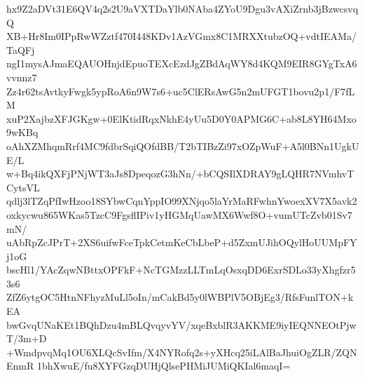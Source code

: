 hx9Z2aDVt31E6QV4q2s2U9aVXTDaYlb0NAba4ZYoU9Dgu3vAXiZrnb3jBzwcsvqQ
XB+Hr8Im0IPpRwWZztf470I448KDv1AzVGmx8C1MRXXtubzOQ+vdtIEAMa/TaQFj
ngI1mysAJmaEQAUOHnjdEpuoTEXcEzdJgZBdAqWY8d4KQM9EIR8GYgTxA6vvnnz7
Zz4r62tsAvtkyFwgk5ypRoA6n9W7s6+uc5ClERsAwG5n2mUFGT1bovu2p1/F7fLM
xuP2XajbzXFJGKgw+0ElKtidRqxNkhE4yUu5D0Y0APMG6C+ab8L8YH64Mxo9wKBq
oAhXZMhqmRrf4MC9fdbrSqiQOfdBB/T2bTIBzZi97xOZpWuF+A5l0BNn1UgkUE/L
w+Bq4ikQXFjPNjWT3aJs8DpeqozG3hNn/+bCQSIlXDRAY9gLQHR7NVmhvTCytsVL
qdlj3lTZqPfIwHzoo18SYbwCqnYppIO99XNjqo5laYrMaRFwhnYwoexXV7X5avk2
oxkycwu865WKas5TzcC9FgsflIPiv1yHGMqUawMX6Wwf8O+vumUTcZvb01Sv7mN/
uAbRpZcJPrT+2XS6uifwFceTpkCetmKeCbLbeP+d5ZxmUJihOQylHoUUMpFYj1oG
bscHl1/YAcZqwNBttxOPFkF+NcTGMzzLLTmLqOsxqDD6ExrSDLo33yXhgfzr53s6
ZfZ6ytgOC5HtnNFhyzMuLl5oIn/mCakBd5y0lWBPlV5OBjEg3/RfsFunlTON+kEA
bwGvqUNaKEt1BQhDzu4mBLQvqyvYV/xqeBxblR3AKKME9iyIEQNNEOtPjwT/3m+D
+WmdpvqMq1OU6XLQcSvIfm/X4NYRofq2s+yXHcq25iLAlBaJhuiOgZLR/ZQNEnmR
1bhXwuE/fu8XYFGzqDUHjQlsePHMiJUMiQKIal6maqI=
